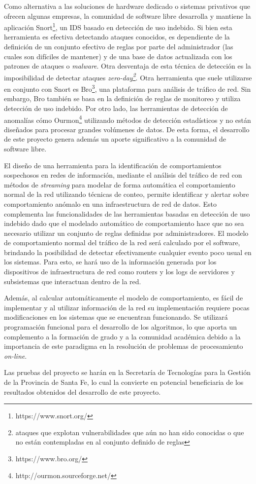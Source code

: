 Como alternativa a las soluciones de hardware dedicado o sistemas privativos que ofrecen algunas empresas, la comunidad de software libre desarrolla y mantiene la aplicación Snort\footnote{https://www.snort.org/}, un IDS basado en detección de uso indebido. Si bien esta herramienta es efectiva detectando ataques conocidos, es dependiente de la definición de un conjunto efectivo de reglas por parte del administrador (las cuales son difíciles de mantener) y de una base de datos actualizada con los patrones de ataques o \textit{malware}. Otra desventaja de esta técnica de detección es la imposibilidad de detectar ataques \textit{zero-day\footnote{ataques que explotan vulnerabilidades que aún no han sido conocidas o que no están contempladas en al conjunto definido de reglas}}\cite{Milenkoski:2015:ECI:2808687.2808691}. Otra herramienta que suele utilizarse en conjunto con Snort es Bro\footnote{https://www.bro.org/}, una plataforma para análisis de tráfico de red. Sin embargo, Bro también se basa en la definición de reglas de monitoreo y utiliza detección de uso indebido. Por otro lado, las herramientas de detección de anomalías cómo Ourmon\footnote{http://ourmon.sourceforge.net/} utilizando métodos de detección estadísticos y no están diseñados para procesar grandes volúmenes de datos. De esta forma, el desarrollo de este proyecto genera además un aporte significativo a la comunidad de software libre. \par

El diseño de una herramienta para la identificación de comportamientos sospechosos en redes de información, mediante el análisis del tráfico de red con métodos de \textit{streaming} para modelar de forma automática el comportamiento normal de la red utilizando técnicas de conteo, permite identificar y alertar sobre comportamiento anómalo en una infraestructura de red de datos. Esto complementa las funcionalidades de las herramientas basadas en detección de uso indebido dado que el modelado automático de comportamiento hace que no sea necesario utilizar un conjunto de reglas definidas por administradores. El modelo de comportamiento normal del tráfico de la red será calculado por el software, brindando la posibilidad de detectar efectivamente cualquier evento poco usual en los sistemas. Para esto, se hará uso de la información generada por los dispositivos de infraestructura de red como routers y los logs de servidores y subsistemas que interactuan dentro de la red. \par
Además, al calcular automáticamente el modelo de comportamiento, es fácil de implementar y al utilizar información de la red su implementación requiere pocas modificaciones en los sistemas que se encuentran funcionando. Se utilizará programación funcional para el desarrollo de los algoritmos, lo que aporta un complemento a la formación de grado y a la comunidad académica debido a la importancia de este paradigma en la resolución de problemas de procesamiento \textit{on-line}. \par
Las pruebas del proyecto se harán en la Secretaría de Tecnologías para la Gestión de la Provincia de Santa Fe, lo cual la convierte en potencial beneficiaria de los resultados obtenidos del desarrollo de este proyecto.  \par

